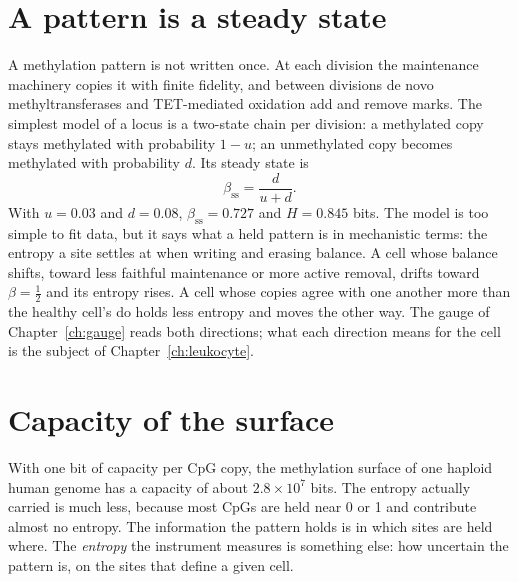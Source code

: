 \section{A pattern is a steady state}

A methylation pattern is not written once. At each division the maintenance machinery copies it
with finite fidelity, and between divisions de novo methyltransferases and TET-mediated oxidation
add and remove marks. The simplest model of a locus is a two-state chain per division: a methylated
copy stays methylated with probability $1-u$; an unmethylated copy becomes methylated with probability
$d$. Its steady state is
\begin{equation}
  \beta_{\mathrm{ss}}=\frac{d}{u+d}.
  \label{eq:steady}
\end{equation}
\derived{} With $u=0.03$ and $d=0.08$, $\beta_{\mathrm{ss}}=0.727$ and $H=0.845$ bits. \calc{} The model is too simple to
fit data, but it says what a held pattern is in mechanistic terms: the entropy a site settles at when writing and erasing
balance. A cell whose balance shifts, toward less faithful maintenance or more active removal, drifts toward $\beta=\tfrac12$
and its entropy rises. A cell whose copies agree with one another more than the healthy cell's do holds less entropy and
moves the other way. The gauge of Chapter~\ref{ch:gauge} reads both directions; what each direction
means for the cell is the subject of Chapter~\ref{ch:leukocyte}.

\section{Capacity of the surface}

With one bit of capacity per CpG copy, the methylation surface of one haploid human genome has a capacity of about
$2.8\times10^7$ bits. \calc{} The entropy actually carried is much less, because most CpGs are held near 0 or 1 and contribute
almost no entropy. The information the pattern holds is in which sites are held where. The \emph{entropy} the instrument
measures is something else: how uncertain the pattern is, on the sites that define a given cell.
